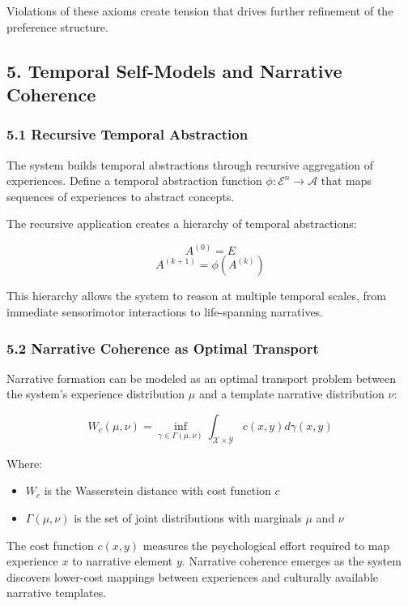 \documentclass[
]{article}
\providecommand{\tightlist}{%
  \setlength{\itemsep}{0pt}\setlength{\parskip}{0pt}}
\begin{document}
Violations of these axioms create tension that drives further refinement
of the preference structure.

\subsection{5. Temporal Self-Models and Narrative
Coherence}\label{temporal-self-models-and-narrative-coherence}

\subsubsection{5.1 Recursive Temporal
Abstraction}\label{recursive-temporal-abstraction}

The system builds temporal abstractions through recursive aggregation of
experiences. Define a temporal abstraction function
\(\phi: \mathcal{E}^n \rightarrow \mathcal{A}\) that maps sequences of
experiences to abstract concepts.

The recursive application creates a hierarchy of temporal abstractions:

\[A^{(0)} = E\] \[A^{(k+1)} = \phi(A^{(k)})\]

This hierarchy allows the system to reason at multiple temporal scales,
from immediate sensorimotor interactions to life-spanning narratives.

\subsubsection{5.2 Narrative Coherence as Optimal
Transport}\label{narrative-coherence-as-optimal-transport}

Narrative formation can be modeled as an optimal transport problem
between the system's experience distribution \(\mu\) and a template
narrative distribution \(\nu\):

\[W_c(\mu, \nu) = \inf_{\gamma \in \Gamma(\mu, \nu)} \int_{\mathcal{X} \times \mathcal{Y}} c(x, y) d\gamma(x, y)\]

Where:

\begin{itemize}
\tightlist
\item
  \(W_c\) is the Wasserstein distance with cost function \(c\)
\item
  \(\Gamma(\mu, \nu)\) is the set of joint distributions with marginals
  \(\mu\) and \(\nu\)
\end{itemize}

The cost function \(c(x, y)\) measures the psychological effort required
to map experience \(x\) to narrative element \(y\). Narrative coherence
emerges as the system discovers lower-cost mappings between experiences
and culturally available narrative templates.
\end{document}

